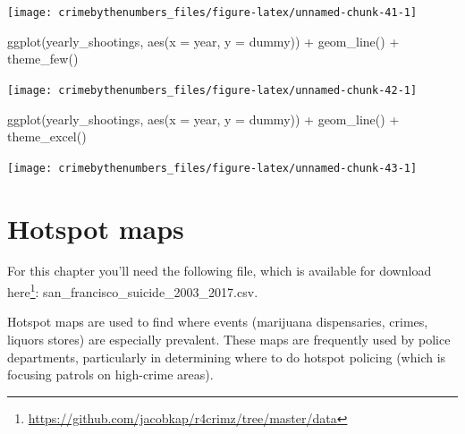\documentclass[
]{krantz}
\makeatletter
\newenvironment{Shaded}{\begin{snugshade}}{\end{snugshade}}
\newcommand{\AttributeTok}[1]{\textcolor[rgb]{0.61,0.61,0.61}{#1}}
\newcommand{\FunctionTok}[1]{\textcolor[rgb]{0,0,0}{#1}}
\newcommand{\NormalTok}[1]{#1}
\newcommand{\SpecialCharTok}[1]{\textcolor[rgb]{0,0,0}{#1}}
\renewcommand{\href}[2]{#2\footnote{\url{#1}}}
\newenvironment{kframe}{%
\medskip{}
\setlength{\fboxsep}{.8em}
 \def\at@end@of@kframe{}%
 \ifinner\ifhmode%
  \def\at@end@of@kframe{\end{minipage}}%
  \begin{minipage}{\columnwidth}%
 \fi\fi%
 \def\FrameCommand##1{\hskip\@totalleftmargin \hskip-\fboxsep
 \colorbox{shadecolor}{##1}\hskip-\fboxsep
     \hskip-\linewidth \hskip-\@totalleftmargin \hskip\columnwidth}%
 \MakeFramed {\advance\hsize-\width
   \@totalleftmargin\z@ \linewidth\hsize
   \@setminipage}}%
 {\par\unskip\endMakeFramed%
 \at@end@of@kframe}
\renewenvironment{Shaded}{\begin{kframe}}{\end{kframe}}
\makeatother
\begin{document}
\begin{center}\texttt{[image: crimebythenumbers\_files/figure-latex/unnamed-chunk-41-1]} \end{center}

\begin{Shaded}
\begin{Highlighting}[]
\FunctionTok{ggplot}\NormalTok{(yearly\_shootings, }\FunctionTok{aes}\NormalTok{(}\AttributeTok{x =}\NormalTok{ year, }\AttributeTok{y =}\NormalTok{ dummy)) }\SpecialCharTok{+}
  \FunctionTok{geom\_line}\NormalTok{() }\SpecialCharTok{+}
  \FunctionTok{theme\_few}\NormalTok{()}
\end{Highlighting}
\end{Shaded}

\begin{center}\texttt{[image: crimebythenumbers\_files/figure-latex/unnamed-chunk-42-1]} \end{center}

\begin{Shaded}
\begin{Highlighting}[]
\FunctionTok{ggplot}\NormalTok{(yearly\_shootings, }\FunctionTok{aes}\NormalTok{(}\AttributeTok{x =}\NormalTok{ year, }\AttributeTok{y =}\NormalTok{ dummy)) }\SpecialCharTok{+}
  \FunctionTok{geom\_line}\NormalTok{() }\SpecialCharTok{+}
  \FunctionTok{theme\_excel}\NormalTok{()}
\end{Highlighting}
\end{Shaded}

\begin{center}\texttt{[image: crimebythenumbers\_files/figure-latex/unnamed-chunk-43-1]} \end{center}

\hypertarget{hotspot-maps}{%
\chapter{Hotspot maps}\label{hotspot-maps}}

For this chapter you'll need the following file, which is available for download \href{https://github.com/jacobkap/r4crimz/tree/master/data}{here}: san\_francisco\_suicide\_2003\_2017.csv.

Hotspot maps are used to find where events (marijuana dispensaries, crimes, liquors stores) are especially prevalent. These maps are frequently used by police departments, particularly in determining where to do hotspot policing (which is focusing patrols on high-crime areas).
\end{document}
